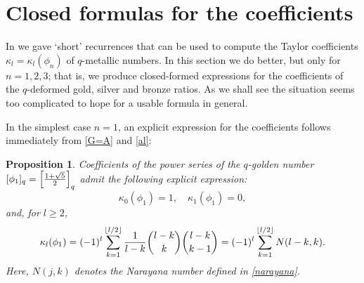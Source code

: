 \documentclass[11pt,reqno]{amsart}
\theoremstyle{plain}
\newtheorem{proposition}[lemme]{Proposition}
\theoremstyle{definition}
\numberwithin{figure}{section}
\numberwithin{table}{section}
\numberwithin{equation}{section}
\newcommand\ka{\kappa}
\let\fr=\frac
\DeclarePairedDelimiter{\floor}{\lfloor}{\rfloor}%
\begin{document}
\section{Closed formulas for the coefficients}\label{sec-formulas}


In  we gave `short' recurrences that can be used to compute the Taylor coefficients $\ka_l=\ka_l(\phi_n)$ of $q$-metallic numbers. 
In this section we do better, but only for $n=1,2,3$; that is, we produce closed-formed expressions for the coefficients of the $q$-deformed gold, silver and bronze ratios. As we shall see the situation seems too complicated to hope for a usable formula in general.

In the simplest case $n=1$, an explicit expression for the coefficients follows immediately from \eqref{G=A} and \eqref{al}:

\begin{proposition} 
Coefficients of the power series of the $q$-golden number $[\phi_1]_q=\Bigl[\fr{1+\sqrt{5}}2\Bigr]_q$ admit the following explicit expression:
\begin{equation*}
\ka_0(\phi_1)=1,\quad \ka_1(\phi_1)=0,
\end{equation*}
and, for $l≥2$,
\begin{equation}\label{g(n)}
\ka_l(\phi_1)=(-1)^l\sum_{k=1}^{\floor{l/2}} \fr 1{l-k}\binom{l-k}{k} \binom{l-k}{k-1}=(-1)^l \sum_{k=1}^{\floor{l/2}}N(l-k,k).
\end{equation}
Here,  $N(j,k)$ denotes the Narayana number defined in \eqref{narayana}.
\end{proposition}
\end{document}
